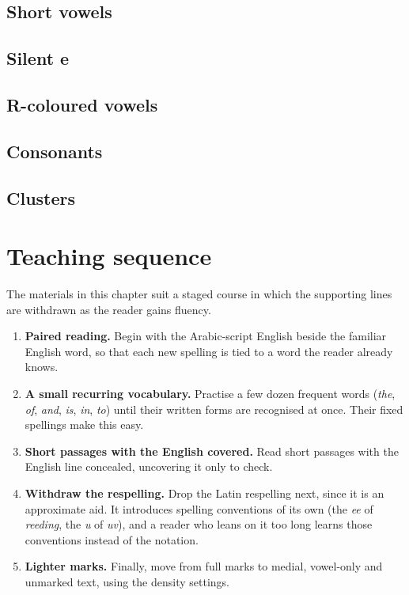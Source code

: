 \subsection{Short vowels}


\subsection{Silent e}


\subsection{R-coloured vowels}


\subsection{Consonants}


\subsection{Clusters}


\section{Teaching sequence}
The materials in this chapter suit a staged course in which the supporting lines are withdrawn as the reader gains fluency.
\begin{enumerate}
\item \textbf{Paired reading.} Begin with the Arabic-script English beside the familiar English word, so that each new spelling is tied to a word the reader already knows.
\item \textbf{A small recurring vocabulary.} Practise a few dozen frequent words (\emph{the}, \emph{of}, \emph{and}, \emph{is}, \emph{in}, \emph{to}) until their written forms are recognised at once. Their fixed spellings make this easy.
\item \textbf{Short passages with the English covered.} Read short passages with the English line concealed, uncovering it only to check.
\item \textbf{Withdraw the respelling.} Drop the Latin respelling next, since it is an approximate aid. It introduces spelling conventions of its own (the \emph{ee} of \emph{reeding}, the \emph{u} of \emph{uv}), and a reader who leans on it too long learns those conventions instead of the notation.
\item \textbf{Lighter marks.} Finally, move from full marks to medial, vowel-only and unmarked text, using the density settings.
\end{enumerate}

